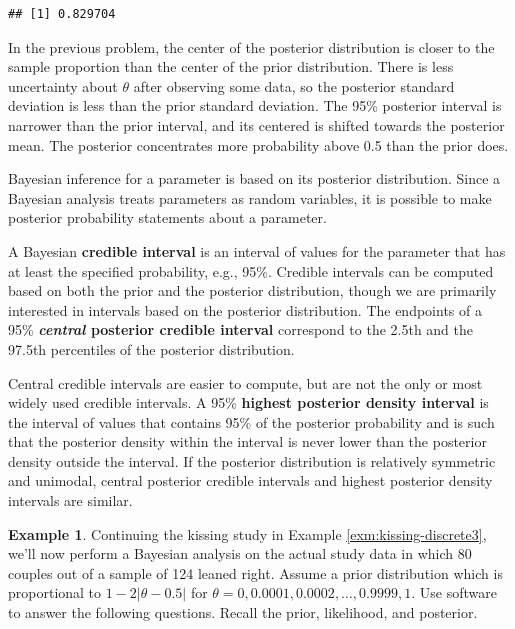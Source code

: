 \documentclass[
]{book}
\theoremstyle{definition}
\theoremstyle{definition}
\newtheorem{example}{Example}[chapter]
\theoremstyle{definition}
\theoremstyle{remark}
\begin{document}
\begin{verbatim}
## [1] 0.829704
\end{verbatim}

In the previous problem, the center of the posterior distribution is closer to the sample proportion than the center of the prior distribution. There is less uncertainty about \(\theta\) after observing some data, so the posterior standard deviation is less than the prior standard deviation. The 95\% posterior interval is narrower than the prior interval, and its centered is shifted towards the posterior mean. The posterior concentrates more probability above 0.5 than the prior does.

Bayesian inference for a parameter is based on its posterior distribution.
Since a Bayesian analysis treats parameters as random variables, it is possible to make posterior probability statements about a parameter.

A Bayesian \textbf{credible interval} is an interval of values for the parameter that has at least the specified probability, e.g., 95\%. Credible intervals can be computed based on both the prior and the posterior distribution, though we are primarily interested in intervals based on the posterior distribution. The endpoints of a 95\% \textbf{\emph{central} posterior credible interval} correspond to the 2.5th and the 97.5th percentiles of the posterior distribution.

Central credible intervals are easier to compute, but are not the only or most widely used credible intervals. A 95\% \textbf{highest posterior density interval} is the interval of values that contains 95\% of the posterior probability and is such that the posterior density within the interval is never lower than the posterior density outside the interval. If the posterior distribution is relatively symmetric and unimodal, central posterior credible intervals and highest posterior density intervals are similar.

\begin{example}
\protect\hypertarget{exm:kissing-summary3}{}{\label{exm:kissing-summary3} }
Continuing the kissing study in Example \ref{exm:kissing-discrete3}, we'll now perform a Bayesian analysis on the actual study data in which 80 couples out of a sample of 124 leaned right. Assume a prior distribution which is proportional to \(1-2|\theta-0.5|\) for \(\theta = 0, 0.0001, 0.0002, \ldots, 0.9999, 1\). Use software to answer the following questions.
Recall the prior, likelihood, and posterior.
\end{example}
\end{document}
